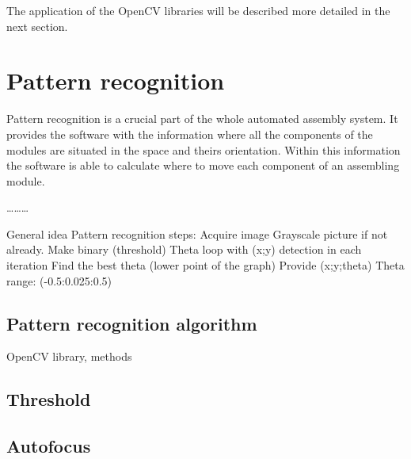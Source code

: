 The application of the OpenCV libraries will be described more detailed in the next section.

\section{Pattern recognition}

Pattern recognition is a crucial part of the whole automated assembly system. It provides the software with the information where all the components of the modules are situated in the space and theirs orientation. Within this information the software is able to calculate where to move each component of an assembling module.

\ldots\ldots\ldots


General idea
Pattern recognition steps:
Acquire image
Grayscale picture if not already.
Make binary (threshold)
Theta loop with (x;y) detection in each iteration
Find the best theta (lower point of the graph)
Provide (x;y;theta)
Theta range:
(-0.5:0.025:0.5)


\subsection{Pattern recognition algorithm}

OpenCV library, methods



\subsection{Threshold}



\subsection{Autofocus}






